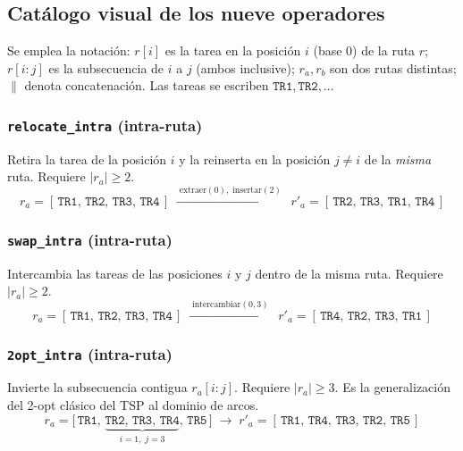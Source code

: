 \documentclass[11pt,a4paper]{article}
\theoremstyle{definition}
\theoremstyle{remark}
\begin{document}
\subsection{Catálogo visual de los nueve operadores}
\label{subsec:catalogo-operadores}

Se emplea la notación: $r[i]$ es la tarea en la posición $i$ (base 0) de la
ruta $r$; $r[i{:}j]$ es la subsecuencia de $i$ a $j$ (ambos inclusive);
$r_a, r_b$ son dos rutas distintas; $\|$ denota concatenación. Las tareas
se escriben $\mathtt{TR1}, \mathtt{TR2}, \dots$

\subsubsection{\texttt{relocate\_intra} (intra-ruta)}
Retira la tarea de la posición $i$ y la reinserta en la posición $j \neq i$
de la \emph{misma} ruta. Requiere $|r_a| \geq 2$.
\[
    r_a = [\,\mathtt{TR1},\, \mathtt{TR2},\, \mathtt{TR3},\, \mathtt{TR4}\,]
    \;\xrightarrow{\;\text{extraer}(0),\;\text{insertar}(2)\;}\;
    r'_a = [\,\mathtt{TR2},\, \mathtt{TR3},\, \mathtt{TR1},\, \mathtt{TR4}\,]
\]

\subsubsection{\texttt{swap\_intra} (intra-ruta)}
Intercambia las tareas de las posiciones $i$ y $j$ dentro de la misma ruta.
Requiere $|r_a| \geq 2$.
\[
    r_a = [\,\mathtt{TR1},\, \mathtt{TR2},\, \mathtt{TR3},\, \mathtt{TR4}\,]
    \;\xrightarrow{\;\text{intercambiar}(0,3)\;}\;
    r'_a = [\,\mathtt{TR4},\, \mathtt{TR2},\, \mathtt{TR3},\, \mathtt{TR1}\,]
\]

\subsubsection{\texttt{2opt\_intra} (intra-ruta)}
Invierte la subsecuencia contigua $r_a[i{:}j]$. Requiere $|r_a| \geq 3$. Es
la generalización del 2-opt clásico del TSP al dominio de arcos.
\[
    r_a = \bigl[\,\mathtt{TR1},\,
    \underbrace{\mathtt{TR2},\, \mathtt{TR3},\, \mathtt{TR4}}_{i=1,\;j=3},\,
    \mathtt{TR5}\,\bigr]
    \;\longrightarrow\;
    r'_a = [\,\mathtt{TR1},\, \mathtt{TR4},\, \mathtt{TR3},\, \mathtt{TR2},\, \mathtt{TR5}\,]
\]
\end{document}
